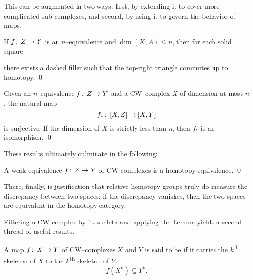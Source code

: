 \noindent
This can be augmented in two ways: first, by extending it to cover more complicated sub-complexes, and second, by using it to govern the behavior of maps.

\begin{lemma}\label{NEquivsLiftNDimlSources}%
If $f\colon\thinspace Z \to Y$ is an $n$--equivalence and $\dim(X, A) \le n$, then for each solid square
\begin{center}
\end{center}
there exists a dashed filler such that the top-right triangle commutes up to homotopy. \qed
{}
\end{lemma}

\begin{corollary}
Given an $n$--equivalence $f\colon\thinspace Z \to Y$ and a CW--complex $X$ of dimension at most $n$, the natural map \[f_*\colon\thinspace [X, Z] \to [X, Y]\] is surjective.
If the dimension of $X$ is strictly less than $n$, then $f_*$ is an isomorphism.
\qed
\end{corollary}

\noindent
These results ultimately culminate in the following:

\begin{corollary}[Whitehead]
A weak equivalence $f\colon\thinspace Z \to Y$ of CW-complexes is a homotopy equivalence.
\qed
\end{corollary}

\noindent
There, finally, is justification that relative homotopy groups truly do measure the discrepancy between two spaces:
%
if the discrepancy vanishes, then the two spaces are equivalent in the homotopy category.

Filtering a CW-complex by its skeleta and applying the Lemma yields a second thread of useful results.

\begin{definition}
A map $f\colon\thinspace X \to Y$ of CW--complexes $X$ and $Y$ is said to be  if it carries the $k$\textsuperscript{th} skeleton of $X$ to the $k$\textsuperscript{th} skeleton of $Y$: \[f(X^k) \subseteq Y^k.\]
\end{definition}


